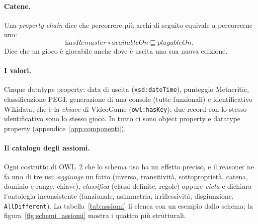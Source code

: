 \documentclass[10pt,a4paper]{article}
\newcommand{\cls}[1]{\textsf{#1}}
\newcommand{\prop}[1]{\textit{#1}}
\begin{document}
\paragraph{Catene.} Una \emph{property chain} dice che percorrere più archi di seguito equivale a percorrerne uno:
\[
  \prop{hasRemaster} \circ \prop{availableOn} \sqsubseteq \prop{playableOn}.
\]
Dice che un gioco è giocabile anche dove è uscita una sua nuova edizione.

\paragraph{I valori.} Cinque datatype property: data di uscita (\texttt{xsd:dateTime}), punteggio Metacritic, classificazione PEGI, generazione di una console (tutte funzionali) e identificativo Wikidata, che è la \emph{chiave} di \cls{VideoGame} (\texttt{owl:hasKey}): due record con lo stesso identificativo sono lo stesso gioco. In tutto ci sono \nObjProp{} object property e \nDataProp{} datatype property (appendice~\ref{app:componenti}).

\paragraph{Il catalogo degli assiomi.} Ogni costrutto di OWL~2 che lo schema usa ha un effetto preciso, e il reasoner ne fa uno di tre usi: \emph{aggiunge} un fatto (inversa, transitività, sottoproprietà, catena, dominio e range, chiave), \emph{classifica} (classi definite, regole) oppure \emph{vieta} e dichiara l'ontologia inconsistente (funzionale, asimmetria, irriflessività, disgiunzione, \texttt{AllDifferent}). La tabella~\ref{tab:assiomi} li elenca con un esempio dallo schema; la figura~\ref{fig:schemi_assiomi} mostra i quattro più strutturali.
\end{document}
